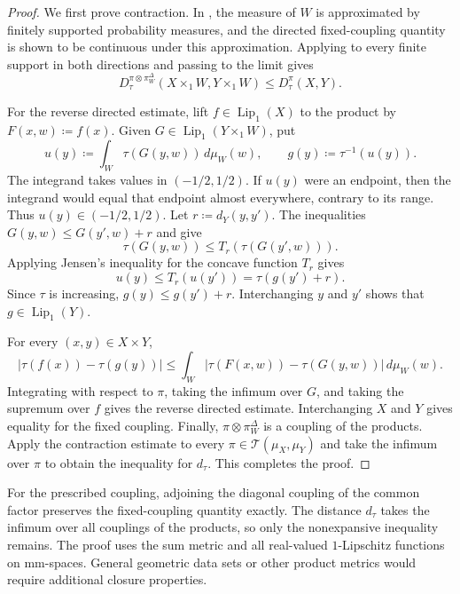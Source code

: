 \documentclass[11pt]{amsart}
\theoremstyle{plain}
\theoremstyle{definition}
\theoremstyle{remark}
\newcommand{\T}{\mathcal T}
\newcommand{\dtau}{d_{\tau}}
\begin{document}
\begin{proof}
We first prove contraction. In , the measure of $W$ is approximated by finitely supported probability measures, and the directed fixed-coupling quantity is shown to be continuous under this approximation. Applying  to every finite support in both directions and passing to the limit gives
\[
D_\tau^{\pi\otimes\pi_W^\Delta}(X\times_1W,Y\times_1W)\leq D_\tau^\pi(X,Y).
\]

For the reverse directed estimate, lift $f\in\operatorname{Lip}_1(X)$ to the product by $F(x,w)\coloneqq f(x)$. Given $G\in\operatorname{Lip}_1(Y\times_1W)$, put
\[
u(y)\coloneqq\int_W\tau(G(y,w))\,d\mu_W(w),\qquad g(y)\coloneqq\tau^{-1}(u(y)).
\]
The integrand takes values in $(-1/2,1/2)$. If $u(y)$ were an endpoint, then the integrand would equal that endpoint almost everywhere, contrary to its range. Thus $u(y)\in(-1/2,1/2)$. Let $r\coloneqq d_Y(y,y')$. The inequalities $G(y,w)\leq G(y',w)+r$ and  give
\[
\tau(G(y,w))\leq T_r(\tau(G(y',w))).
\]
Applying Jensen's inequality for the concave function $T_r$ \cite[Section~1.2.1, Equation~(1.2.1), p.~10]{bakry-gentil-ledoux2014markov} gives
\[
u(y)\leq T_r(u(y'))=\tau(g(y')+r).
\]
Since $\tau$ is increasing, $g(y)\leq g(y')+r$. Interchanging $y$ and $y'$ shows that $g\in\operatorname{Lip}_1(Y)$.

For every $(x,y)\in X\times Y$,
\[
|\tau(f(x))-\tau(g(y))|\leq\int_W|\tau(F(x,w))-\tau(G(y,w))|\,d\mu_W(w).
\]
Integrating with respect to $\pi$, taking the infimum over $G$, and taking the supremum over $f$ gives the reverse directed estimate. Interchanging $X$ and $Y$ gives equality for the fixed coupling. Finally, $\pi\otimes\pi_W^\Delta$ is a coupling of the products. Apply the contraction estimate to every $\pi\in\T(\mu_X,\mu_Y)$ and take the infimum over $\pi$ to obtain the inequality for $\dtau$. This completes the proof.
\end{proof}

For the prescribed coupling, adjoining the diagonal coupling of the common factor preserves the fixed-coupling quantity exactly. The distance $\dtau$ takes the infimum over all couplings of the products, so only the nonexpansive inequality remains. The proof uses the sum metric and all real-valued $1$-Lipschitz functions on mm-spaces. General geometric data sets or other product metrics would require additional closure properties.

\appendix
\end{document}
